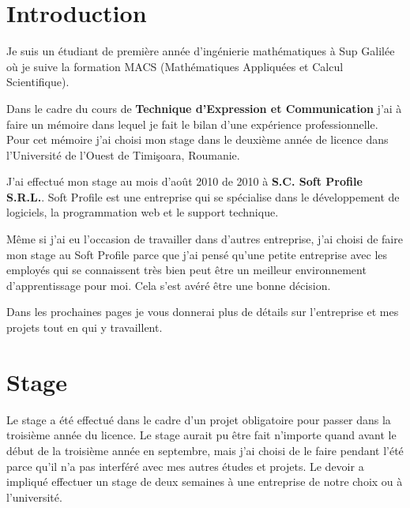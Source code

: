 \documentclass[a4paper,10pt]{report}
\begin{document}

{\Large \tableofcontents }


\chapter*{Introduction}

Je suis un \'etudiant de premi\`ere ann\'ee d'ing\'enierie mathématiques \`a Sup Galil\'ee o\`u je
suive la formation MACS (Math\'ematiques Appliqu\'ees et Calcul Scientifique).

Dans le cadre du cours de \textbf{Technique d'Expression et Communication} j'ai \`a faire
un mémoire dans lequel je fait le bilan d'une expérience professionnelle. Pour cet mémoire
j'ai choisi mon stage dans le deuxième année de licence dans l’Université de l'Ouest
de Timi\c{s}oara, Roumanie.

J'ai effectu\'e mon stage au mois d’ao\^ut 2010 de 2010 \`a \textbf{S.C. Soft Profile S.R.L.}.
Soft Profile est une entreprise qui se spécialise dans le développement de logiciels,
la programmation web et le support technique.

Même si j'ai eu l'occasion de travailler dans d'autres entreprise, j'ai choisi de
faire mon stage au Soft Profile parce que j'ai pens\'e qu'une petite entreprise avec les
employés qui se connaissent très bien peut être un meilleur environnement d'apprentissage
pour moi. Cela s'est avéré être une bonne décision.

Dans les prochaines pages je vous donnerai plus de détails sur l'entreprise et mes projets tout en
qui y travaillent.

\chapter{Stage}

Le stage a été effectué dans le cadre d'un projet obligatoire pour passer dans la troisième
année du licence. Le stage aurait pu être fait n'importe quand avant le début de la troisième
année en septembre, mais j'ai choisi de le faire pendant l'été parce qu'il n'a pas interféré avec
mes autres études et projets. Le devoir a impliqué effectuer un stage de deux semaines à une entreprise
de notre choix ou à l'université.
\end{document}

